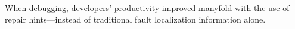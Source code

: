 \documentclass[10pt, conference, compsocconf]{IEEEtran}
\begin{document}
When debugging, developers’ productivity improved manyfold with the use of repair hints—instead of traditional fault localization information alone.


%
%



%
%
\end{document}
